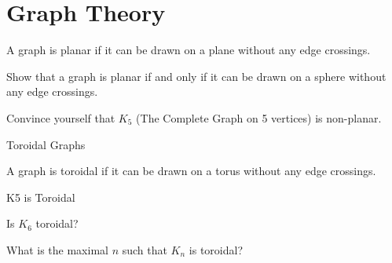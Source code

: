 \section{Graph Theory}
\begin{boxProblem}{}
    \begin{boxDefinition}{}
        A graph is planar if it can be drawn on a plane without any edge crossings.
    \end{boxDefinition}
    Show that a graph is planar if and only if it can be drawn on a sphere without any edge crossings.
\end{boxProblem}
\begin{boxProblem}{}
    Convince yourself that \( K_5 \) (The Complete Graph on 5 vertices) is non-planar.
\end{boxProblem}
\begin{boxProblem}{Toroidal Graphs}
\begin{boxDefinition}{}
    A graph is toroidal if it can be drawn on a torus without any edge crossings.
\end{boxDefinition}
    \begin{boxExample}{K5 is Toroidal}
    
    \end{boxExample}
    \begin{boxProblem}{}
        Is \( K_6 \) toroidal?
    \end{boxProblem}
    \begin{boxProblem}{}
        What is the maximal \( n \) such that \( K_n \) is toroidal?
    \end{boxProblem}
\end{boxProblem}

